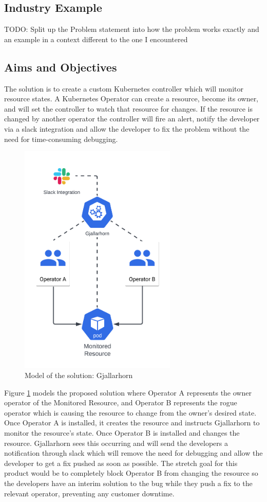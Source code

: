 \documentclass{article}
\begin{document}
\subsection{Industry Example}
TODO: Split up the Problem statement into how the problem works exactly and an example in a context different to the one I encountered

\subsection{Aims and Objectives}
The solution is to create a custom Kubernetes controller which will monitor resource states. 
A Kubernetes Operator can create a resource, become its owner, and will set the controller to watch that resource for changes. 
If the resource is changed by another operator the controller will fire an alert, notify the developer via a slack integration and allow the developer to fix the problem without the need for time-consuming debugging. 

\begin{figure}[!hb]
    \centering
    \includegraphics[width=75mm]{resources/solution-model.png}
    \caption{Model of the solution: Gjallarhorn}
    \label{solution-model}
\end{figure}

Figure \ref{solution-model} models the proposed solution where Operator A represents the owner operator of the Monitored Resource, and Operator B represents the rogue operator which is causing the resource to change from the owner’s desired state. 
Once Operator A is installed, it creates the resource and instructs Gjallarhorn to monitor the resource’s state. 
Once Operator B is installed and changes the resource. 
Gjallarhorn sees this occurring and will send the developers a notification through slack which will remove the need for debugging and allow the developer to get a fix pushed as soon as possible. 
The stretch goal for this product would be to completely block Operator B from changing the resource so the developers have an interim solution to the bug while they push a fix to the relevant operator, preventing any customer downtime.
\end{document}
